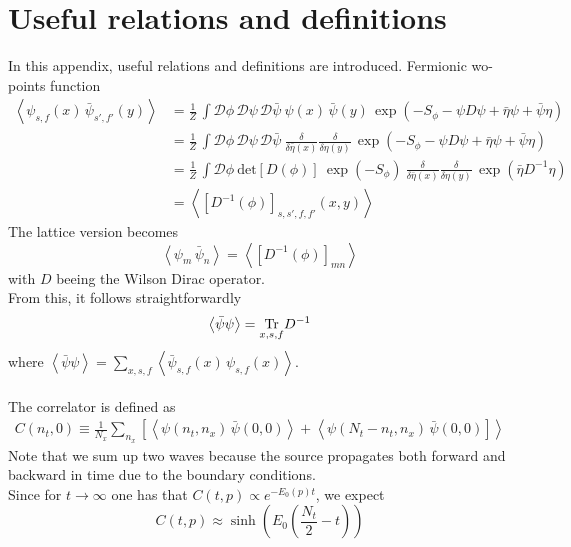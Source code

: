 
\chapter{Useful relations and definitions} %

\label{AppendixA} %
In this appendix, useful relations and definitions are introduced.
Fermionic wo-points function
\begin{equation} 
\begin{aligned}
    \left\langle \psi_{s,f}(x) \, \bar\psi_{s',f'}(y) \right\rangle 
    &= \frac{1}{Z} \, \int \mathcal{D}\phi \, \mathcal{D}\psi \, \mathcal{D}\bar\psi \ \psi(x) \, \bar\psi(y) \, \exp \left( - S_\phi - \psi D \psi + \bar\eta \psi + \bar \psi \eta \right) \\
    &= \frac{1}{Z} \, \int \mathcal{D}\phi \, \mathcal{D}\psi \, \mathcal{D}\bar\psi \ \frac{\delta}{\delta \bar \eta(x)} \frac{\delta}{\delta \eta(y)} \, \exp \left( - S_\phi - \psi D \psi + \bar\eta \psi + \bar \psi \eta \right) \\
    &= \frac{1}{Z} \, \int \mathcal{D}\phi \ \text{det}\left[D(\phi)\right] \ \exp \left( - S_\phi \right) \ \frac{\delta}{\delta \bar \eta(x)} \frac{\delta}{\delta \eta(y)} \, \exp\left( \bar\eta D^{-1} \eta \right) \\
    &= \left\langle \left[D^{-1}(\phi)\right]_{s,s',f,f'}(x,y)\right\rangle
\end{aligned}
\label{eq:D_inv_condensate}
\end{equation}
The lattice version becomes
\begin{equation*}
     \left\langle \psi_m \, \bar\psi_n \right\rangle =     \left\langle \left[D^{-1}(\phi)\right]_{mn}\right\rangle
\end{equation*}
with $D$ beeing the Wilson Dirac operator. \\
From this, it follows straightforwardly
\begin{equation*}
    \left\langle  \bar\psi \psi \right\rangle = \underset{x,s,f}{\operatorname{\text{Tr}}} D^{-1}
\end{equation*}
where $\left\langle  \bar\psi \psi \right\rangle = \underset{x,s,f}\sum  \left\langle \bar\psi_{s,f}(x) \, \psi_{s,f}(x) \right\rangle$. \\~\\
The correlator is defined as
\begin{align*}
    C(n_t,0) \equiv \frac{1}{N_x} \sum_{n_x} \left[\left\langle \psi(n_t, n_x) \, \bar\psi(0,0)\right\rangle + \left\langle \psi(N_t-n_t, n_x) \, \bar\psi(0,0) \right] \right\rangle
\end{align*}
Note that we sum up two waves because the source propagates both forward and backward in time due to the boundary conditions. \\
Since for $t \to \infty$ one has that $C(t,p) \propto e^{-E_0(p) t}$, we expect 
\begin{equation*}
    C(t,p) \approx \sinh \left(E_0 \left(\frac{N_t}{2} - t\right)\right)
\end{equation*}

